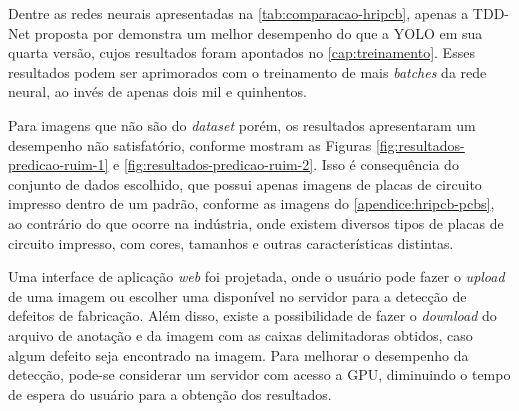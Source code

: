 Dentre as redes neurais apresentadas na \autoref{tab:comparacao-hripcb}, apenas a TDD-Net proposta por  demonstra um melhor desempenho do que a YOLO em sua quarta versão, cujos resultados foram apontados no \autoref{cap:treinamento}. Esses resultados podem ser aprimorados com o treinamento de mais \textit{batches} da rede neural, ao invés de apenas dois mil e quinhentos.

Para imagens que não são do \textit{dataset} porém, os resultados apresentaram um desempenho não satisfatório, conforme mostram as Figuras \ref{fig:resultados-predicao-ruim-1} e \ref{fig:resultados-predicao-ruim-2}. Isso é consequência do conjunto de dados escolhido, que possui apenas imagens de placas de circuito impresso dentro de um padrão, conforme as imagens do \autoref{apendice:hripcb-pcbs}, ao contrário do que ocorre na indústria, onde existem diversos tipos de placas de circuito impresso, com cores, tamanhos e outras características distintas.

Uma interface de aplicação \textit{web} foi projetada, onde o usuário pode fazer o \textit{upload} de uma imagem ou escolher uma disponível no servidor para a detecção de defeitos de fabricação. Além disso, existe a possibilidade de fazer o \textit{download} do arquivo de anotação e da imagem com as caixas delimitadoras obtidos, caso algum defeito seja encontrado na imagem. Para melhorar o desempenho da detecção, pode-se considerar um servidor com acesso a GPU, diminuindo o tempo de espera do usuário para a obtenção dos resultados.

